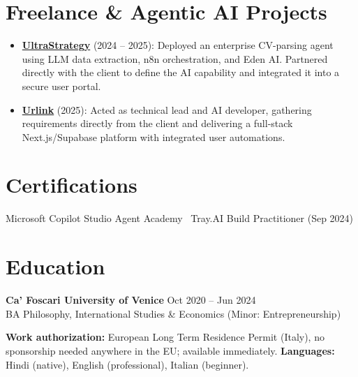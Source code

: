 \documentclass[a4paper,10pt]{article}
\begin{document}
\section{Freelance \& Agentic AI Projects}
\begin{itemize}
 \item \textbf{\href{https://ultrastrategy.com}{UltraStrategy}} (2024 -- 2025): Deployed an enterprise CV-parsing agent using LLM data extraction, n8n orchestration, and Eden AI. Partnered directly with the client to define the AI capability and integrated it into a secure user portal.
 \item \textbf{\href{https://smarturlink.com/}{Urlink}} (2025): Acted as technical lead and AI developer, gathering requirements directly from the client and delivering a full-stack Next.js/Supabase platform with integrated user automations.
\end{itemize}

\section{Certifications}
Microsoft Copilot Studio Agent Academy \textbullet\ Tray.AI Build Practitioner (Sep 2024)

\section{Education}
\textbf{Ca' Foscari University of Venice} \hfill Oct 2020 -- Jun 2024\\
BA Philosophy, International Studies \& Economics (Minor: Entrepreneurship)

\vspace{2pt}
{\small \textbf{Work authorization:} European Long Term Residence Permit (Italy), no sponsorship needed anywhere in the EU; available immediately. \quad \textbf{Languages:} Hindi (native), English (professional), Italian (beginner).}
\end{document}
